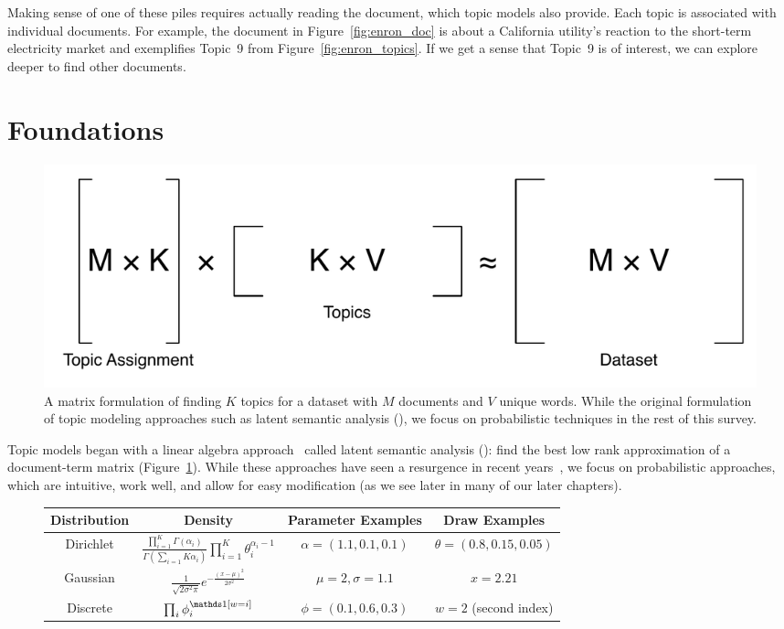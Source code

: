 Making sense of one of these piles requires actually reading the
document, which topic models also provide.  Each topic is associated
with individual documents.  For example, the document in
Figure~\ref{fig:enron_doc} is about a California utility's reaction to
the short-term electricity market and exemplifies Topic~9 from
Figure~\ref{fig:enron_topics}.  If we get a sense that Topic~9 is of
interest, we can explore deeper to find other documents.

\section{Foundations}

\begin{center}
\begin{figure}
  \includegraphics[width=.8\linewidth]{figures/matrix_factorization}
  \caption{A matrix formulation of finding $K$ topics for a dataset
    with $M$ documents and $V$ unique words.  While the original
    formulation of topic modeling approaches such as latent semantic
    analysis (), we focus on probabilistic techniques in the
    rest of this survey.}
  \label{fig:matrix_topics}
\end{figure}
\end{center}

Topic models began with a linear algebra approach~\citep{deerwester-90} called
latent semantic analysis (): find the best low rank approximation of a
document-term matrix (Figure~\ref{fig:matrix_topics}).  While these approaches
have seen a resurgence in recent years~\citep{anandkumar-12:lda,arora-13}, we
focus on probabilistic approaches, which are intuitive, work well, and allow for
easy modification (as we see later in many of our later chapters).

\begin{figure}
  \begin{tabular}{cccc}
    Distribution & Density & Parameter Examples & Draw Examples \\
    \hline
    Dirichlet & $\frac{\prod_{i=1}^K \Gamma(\alpha_i)}{\Gamma \left( \sum_{i=1}{K} \alpha_i \right)} \prod_{i=1}^K \theta_i^{\alpha_i - 1} $ & $\alpha = (1.1, 0.1, 0.1)$  & $\theta = (0.8, 0.15, 0.05)$ \\
    Gaussian  & $\frac{1}{\sqrt{2 \sigma^2 \pi}} e^{- \frac{(x-\mu)^2}{2 \sigma^2}}$ & $\mu=2, \sigma=1.1$ & $x=2.21$\\
    Discrete  & $\prod_i \phi_i^{\ind{w=i}}$ & $\phi=(0.1, 0.6, 0.3)$ & $w=2$ (second index) \\
    \hline
  \end{tabular}
  \label{fig:distribution_examples}
\end{figure}

